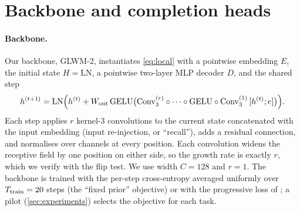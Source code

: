 \section{Backbone and completion heads}
\label{sec:method}

\paragraph{Backbone.} Our backbone, GLWM-2, instantiates \cref{eq:local} with a pointwise embedding $E$,
the initial state $H=\mathrm{LN}$, a pointwise two-layer MLP decoder $D$, and the shared step
\begin{equation}
  h^{(t+1)} = \mathrm{LN}\Bigl(h^{(t)} + W_{\mathrm{out}}\,
  \mathrm{GELU}\bigl(\mathrm{Conv}^{(r)}_{3}\circ\cdots\circ\mathrm{GELU}\circ\mathrm{Conv}^{(1)}_{3}\,[h^{(t)}; e]\bigr)\Bigr).
  \label{eq:step}
\end{equation}
Each step applies $r$ kernel-3 convolutions to the current state concatenated with the input embedding
(input re-injection, or ``recall''), adds a residual connection, and normalises over channels at every
position. Each convolution widens the receptive field by one position on either side, so the growth rate
is exactly $r$, which we verify with the flip test. We use width $C=128$ and $r=1$. The backbone is
trained with the per-step cross-entropy averaged uniformly over $T_{\mathrm{train}}=20$ steps (the ``fixed prior''
objective) or with the progressive loss of \citet{bansal2022endtoend}; a pilot (\cref{sec:experiments})
selects the objective for each task.

